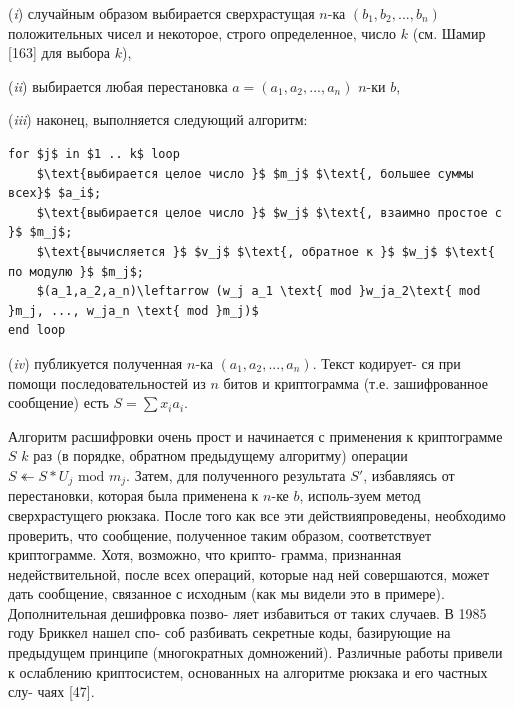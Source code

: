 \documentclass{../template/mai_book}
\begin{document}
 
\par (\textit{i}) случайным образом выбирается сверхрастущая $n$-ка $(b_1,b_2,...,b_n)$\linebreak
положительных чисел и некоторое, строго определенное, число $k$\linebreak
\pagebreak
(см. Шамир [163] для выбора $k$),
\par  (\textit{ii}) выбирается любая перестановка $a = (a_1,a_2,...,a_n)$ $n$-ки $b$,
\par  (\textit{iii}) наконец, выполняется следующий алгоритм:
\begin{lstlisting}[mathescape=true]
for $j$ in $1 .. k$ loop
	$\text{выбирается целое число }$ $m_j$ $\text{, большее суммы всех}$ $a_i$;
	$\text{выбирается целое число }$ $w_j$ $\text{, взаимно простое с }$ $m_j$;
	$\text{вычисляется }$ $v_j$ $\text{, обратное к }$ $w_j$ $\text{ по модулю }$ $m_j$;
	$(a_1,a_2,a_n)\leftarrow (w_j a_1 \text{ mod }w_ja_2\text{ mod }m_j, ..., w_ja_n \text{ mod }m_j)$
end loop
\end{lstlisting}	
\normalsize \par  (\textit{iv}) публикуется полученная $n$-ка $(a_1,a_2,...,a_n)$. Текст кодирует­-\linebreak
ся при помощи последовательностей из $n$ битов и криптограмма (т.е.\linebreak
зашифрованное сообщение) есть $S = \sum x_i a_i$.

Алгоритм расшифровки очень прост и начинается с применения к\linebreak
криптограмме $S$ $k$ раз (в порядке, обратном предыдущему алгоритму)\linebreak
операции $S \twoheadleftarrow S * U_j \text{ mod } m_j$. Затем, для полученного результата $S'$,\linebreak
избавляясь от перестановки, которая была применена к $n$-ке $b$, исполь­-\linebreak зуем метод сверхрастущего рюкзака. После того как все эти действия\linebreak проведены, необходимо проверить, что сообщение, полученное таким\linebreak
образом, соответствует криптограмме. Хотя, возможно, что крипто­-\linebreak
грамма, признанная недействительной, после всех операций, которые\linebreak
над ней совершаются, может дать сообщение, связанное с исходным\linebreak
(как мы видели это в примере). Дополнительная дешифровка позво­-\linebreak
ляет избавиться от таких случаев. В 1985 году Бриккел нашел спо­-\linebreak
соб разбивать секретные коды, базирующие на предыдущем принципе\linebreak
(многократных домножений). Различные работы привели к ослаблению\linebreak
криптосистем, основанных на алгоритме рюкзака и его частных слу­-\linebreak
чаях [47].
\end{document}
